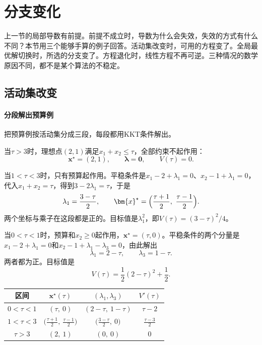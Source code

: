 \section{分支变化}
\label{sec:sens-branches}

上一节的局部导数有前提。前提不成立时，导数为什么会失效，失效的方式有什么不同？本节用三个能够手算的例子回答。活动集改变时，可用的方程变了。全局最优解切换时，所选的分支变了。方程退化时，线性方程不再可逆。三种情况的数学原因不同，都不是某个算法的不稳定。

\subsection{活动集改变}
\label{sec:sens-active-change}

\paragraph{分段解出预算例}
把预算例按活动集分成三段，每段都用KKT条件解出。

当$\tau>3$时，理想点$(2,1)$满足$x_1+x_2\leq\tau$，全部约束不起作用：
\[
 \bm{x}^\star=(2,1),\qquad\bm{\lambda}=\bm{0},\qquad V(\tau)=0.
\]

当$1<\tau<3$时，只有预算起作用。平稳条件是$x_1-2+\lambda_1=0$、$x_2-1+\lambda_1=0$，代入$x_1+x_2=\tau$，得到$3-2\lambda_1=\tau$，于是
\[
 \lambda_1=\frac{3-\tau}{2},\qquad
 \bm{x}^\star=\Bigl(\frac{\tau+1}{2},\ \frac{\tau-1}{2}\Bigr).
\]
两个坐标与乘子在这段都是正的。目标值是$\lambda_1^2$，即$V(\tau)=(3-\tau)^2/4$。

当$0<\tau<1$时，预算和$x_2\geq0$起作用，$\bm{x}^\star=(\tau,0)$。平稳条件的两个分量是$x_1-2+\lambda_1=0$和$x_2-1+\lambda_1-\lambda_3=0$，由此解出
\[
 \lambda_1=2-\tau,\qquad\lambda_3=1-\tau.
\]
两者都为正。目标值是
\[
 V(\tau)=\frac12(2-\tau)^2+\frac12.
\]

\begin{BookInlineTable}
 \centering
 \begin{tabular}{cccc}
  \toprule
  区间 & $\bm{x}^\star(\tau)$ & $(\lambda_1,\lambda_3)$ & $V'(\tau)$\\
  \midrule
  $0<\tau<1$ & $(\tau,\ 0)$ & $(2-\tau,\ 1-\tau)$ & $\tau-2$\\
  $1<\tau<3$ & $\bigl(\frac{\tau+1}{2},\ \frac{\tau-1}{2}\bigr)$ & $\bigl(\frac{3-\tau}{2},\ 0\bigr)$ & $\frac{\tau-3}{2}$\\
  $\tau>3$ & $(2,\ 1)$ & $(0,\ 0)$ & $0$\\
  \bottomrule
 \end{tabular}
 \caption{预算例的三段解，$\lambda_2$在所有区间都等于零。每一段内$V'(\tau)=-\lambda_1$，这正是乘子的边际解释。}
 \label{tab:sens-budget-pieces}
\end{BookInlineTable}

